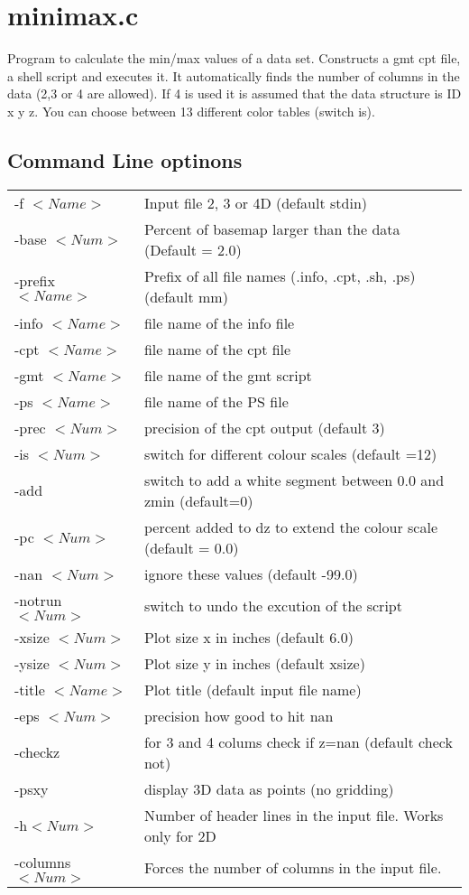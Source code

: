 \documentclass{article}
\begin{document}
\section{minimax.c}


Program to calculate the min/max values of a data set.
Constructs a gmt cpt file, a shell script and executes it.
It automatically finds the number of columns in the data 
(2,3 or 4 are allowed). If 4 is used it is assumed that the data
structure is ID x y z. You can choose between 13 different color
tables (switch is). 

\subsection*{Command Line optinons}
\begin{tabular}[t]{lp{10cm}} 
-f $<Name>$ & Input file 2, 3 or 4D (default stdin)\\
-base $<Num>$ &  Percent of basemap larger than the data (Default =
2.0)\\
-prefix $<Name>$ & Prefix of all file names (.info, .cpt, .sh, .ps)
(default mm)\\
-info $<Name>$  & file name of the info file \\
-cpt $<Name>$   & file name of the cpt file \\
-gmt $<Name>$   & file name of the gmt script\\
-ps $<Name>$    & file name of the PS file \\
-prec $<Num>$   & precision of the cpt output (default 3)\\
-is $<Num>$     & switch for different colour scales (default =12)\\
-add            & switch to add a white segment between 0.0 and zmin
                   (default=0)\\
-pc $<Num>$     & percent added to dz to extend the colour scale 
                  (default = 0.0)\\
-nan $<Num>$    & ignore these values (default -99.0)\\
-notrun $<Num>$ & switch to undo the  excution of the script \\
-xsize $<Num>$  & Plot size x in inches (default 6.0)\\
-ysize $<Num>$  & Plot size y in inches (default xsize)\\
-title $<Name>$ & Plot title (default input file name)\\
-eps $<Num>$    & precision how good to hit nan\\
-checkz         & for 3 and 4 colums check if z=nan (default check
                  not)\\
-psxy           & display 3D data as points (no gridding)\\
-h$<Num>$       & Number of header lines in the input file. Works only
for 2D\\
-columns $<Num>$ & Forces the number of columns in the input file.
\end{tabular}
\end{document}
